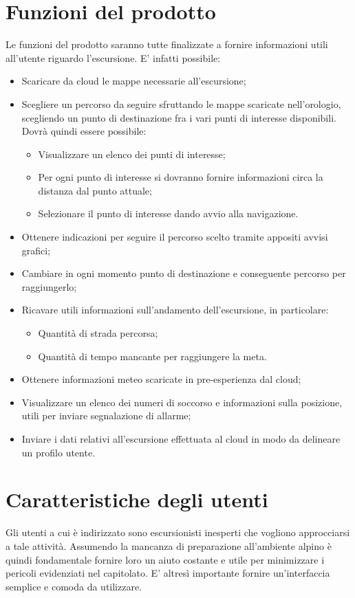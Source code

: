 \section{Funzioni del prodotto}
Le funzioni del prodotto saranno tutte finalizzate a fornire informazioni utili all'utente riguardo l'escursione. E' infatti possibile:
\begin{itemize}
\item Scaricare da cloud le mappe necessarie all'escursione;
\item Scegliere un percorso da seguire sfruttando le mappe scaricate nell'orologio, scegliendo un punto di destinazione fra i vari punti di interesse disponibili. \\Dovrà quindi essere possibile:
\begin{itemize}
\item Visualizzare un elenco dei punti di interesse;
\item Per ogni punto di interesse si dovranno fornire informazioni circa la distanza dal punto attuale;
\item Selezionare il punto di interesse dando avvio alla navigazione.
\end{itemize}
\item Ottenere indicazioni per seguire il percorso scelto tramite appositi avvisi grafici;
\item Cambiare in ogni momento punto di destinazione e conseguente percorso per raggiungerlo;
\item Ricavare utili informazioni sull'andamento dell'escursione, in particolare:
\begin{itemize}
\item Quantità di strada percorsa;
\item Quantità di tempo mancante per raggiungere la meta.
\end{itemize}
\item Ottenere informazioni meteo scaricate in pre-esperienza dal cloud;
\item Visualizzare un elenco dei numeri di soccorso e informazioni sulla posizione, utili per inviare segnalazione di allarme;
\item Inviare i dati relativi all'escursione effettuata al cloud in modo da delineare un profilo utente.
\end{itemize}

\section{Caratteristiche degli utenti}
Gli utenti a cui è indirizzato \CAPITOLATO{} sono escursionisti inesperti che vogliono approcciarsi a tale attività. Assumendo la mancanza di preparazione all'ambiente alpino è quindi fondamentale fornire loro un aiuto costante e utile per minimizzare i pericoli evidenziati nel capitolato. E' altresì importante fornire un'interfaccia semplice e comoda da utilizzare.

